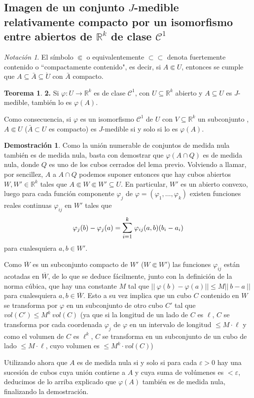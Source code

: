 \documentclass[12pt,twoside]{report}
\newcommand\mc[1]{\mathcal{#1}}
\theoremstyle{azul}
\theoremstyle{azul2}
\theoremstyle{plain}
\theoremstyle{definition}
\newtheorem*{dem}{Demostración}
\newtheorem*{theo}{Teorema}
\theoremstyle{remark}
\newtheorem*{nota}{Notación}
\begin{document}
\subsection{Imagen de un conjunto $J$-medible relativamente compacto por un isomorfismo entre abiertos de $\mathbb{R}^k$ de clase $\mc{C}^1$}
\begin{nota}
El símbolo $\Subset$ o equivalentemente $\subset \subset$ denota fuertemente contenido o ``compactamente contenido", es decir, si $A \Subset U$, entonces se cumple que $A \subseteq \bar{A} \subseteq \mathring{U}$ con $\bar{A}$ compacto.
\end{nota}
\begin{theo} \textbf{2.} \label{teo2}
Si $\varphi: U \longrightarrow \mathbb{R}^k$ es de clase $\mc{C}^1$, con $U \subseteq \mathbb{R}^k$ abierto y $A \subseteq U$ es $J$-medible, también lo es $\varphi(A)$. 

Como consecuencia, si $\varphi$ es un isomorfismo $\mc{C}^1$ de $U$ con $V \subseteq \mathbb{R}^k$ un subconjunto , $A \Subset U$ ($\bar{A} \subset U$ es compacto) es $J$-medible si y solo si lo es $\varphi(A)$.
\end{theo}
\begin{dem}
Como la unión numerable de conjuntos de medida nula también es de medida nula, basta con demostrar que $\varphi(A \cap Q)$ es de medida nula, donde $Q$ es uno de los cubos cerrados del lema previo. Volviendo a llamar, por sencillez, $A$ a $A \cap Q$ podemos suponer entonces que hay cubos abiertos $W, W' \in \mathbb{R}^k$ tales que $A \Subset W \Subset W' \subseteq U$. En particular, $W'$ es un abierto convexo, luego para cada función componente $\varphi_j$ de $\varphi=(\varphi_1, \ldots, \varphi_k)$ existen funciones reales continuas $\varphi_{ij}$ en $W'$ tales que $$\varphi_j(b)-\varphi_j(a)=\mathlarger{\sum_{i=1}^k} \; \varphi_{ij}(a,b)(b_i-a_i)$$
para cualesquiera $a,b \in W'$.

Como $\overline{W}$ es un subconjunto compacto de $W'$ ($W \Subset W'$) las funciones $\varphi_{ij}$ están acotadas en $\overline{W}$, de lo que se deduce fácilmente, junto con la definición de la norma cúbica, que hay una constante $M$ tal que $||\: \varphi(b)-\varphi(a)|| \leq M||\:b-a\:||$ para cualesquiera $a,b \in \overline{W}$. Esto a su vez implica que un cubo $C$ contenido en $W$ se transforma por $\varphi$ en un subconjunto de otro cubo $C'$ tal que $vol(C') \leq M^k \: vol(C)$ (ya que si la longitud de un lado de $C$ es $\ell$, $C$ se transforma por cada coordenada $\varphi_j$ de $\varphi$ en un intervalo de longitud $\leq M \cdot \ell$ y como el volumen de $C$ es $\ell^k$, $C$ se transforma en un subconjunto de un cubo de lado $\leq M \cdot \ell$, cuyo volumen es $\leq M^k \cdot vol(C)$)

Utilizando ahora que $A$ es de medida nula si y solo si para cada $\varepsilon > 0$ hay una sucesión de cubos cuya unión contiene a $A$ y cuya suma de volúmenes es $< \varepsilon$, deducimos de lo arriba explicado que $\varphi(A)$ también es de medida nula, finalizando la demostración.
\end{dem}
\end{document}
